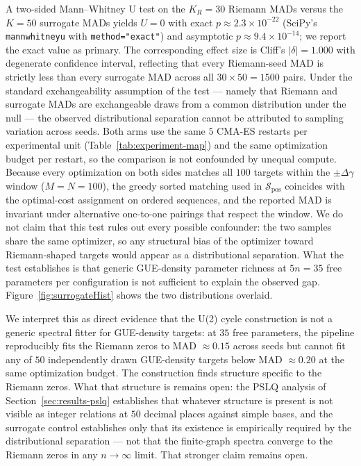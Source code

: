 \documentclass[cntp]{ipart}
\theoremstyle{plain}
\theoremstyle{remark}
\begin{document}
A two-sided Mann--Whitney U test on the $K_R = 30$ Riemann MADs versus the $K = 50$ surrogate MADs yields $U = 0$ with exact $p \approx 2.3 \times 10^{-22}$ (SciPy's \texttt{mannwhitneyu} with \texttt{method="exact"}) and asymptotic $p \approx 9.4 \times 10^{-14}$; we report the exact value as primary. The corresponding effect size is Cliff's $|\delta| = 1.000$ with degenerate confidence interval, reflecting that every Riemann-seed MAD is strictly less than every surrogate MAD across all $30 \times 50 = 1500$ pairs. Under the standard exchangeability assumption of the test --- namely that Riemann and surrogate MADs are exchangeable draws from a common distribution under the null --- the observed distributional separation cannot be attributed to sampling variation across seeds. Both arms use the same $5$ CMA-ES restarts per experimental unit (Table~\ref{tab:experiment-map}) and the same optimization budget per restart, so the comparison is not confounded by unequal compute. Because every optimization on both sides matches all $100$ targets within the $\pm \Delta\gamma$ window ($M = N = 100$), the greedy sorted matching used in $\mathcal{S}_{\mathrm{pos}}$ coincides with the optimal-cost assignment on ordered sequences, and the reported MAD is invariant under alternative one-to-one pairings that respect the window. We do not claim that this test rules out every possible confounder: the two samples share the same optimizer, so any structural bias of the optimizer toward Riemann-shaped targets would appear as a distributional separation. What the test establishes is that generic GUE-density parameter richness at $5n = 35$ free parameters per configuration is not sufficient to explain the observed gap. Figure~\ref{fig:surrogateHist} shows the two distributions overlaid.

We interpret this as direct evidence that the U(2) cycle construction is not a generic spectral fitter for GUE-density targets: at $35$ free parameters, the pipeline reproducibly fits the Riemann zeros to MAD $\approx 0.15$ across seeds but cannot fit any of $50$ independently drawn GUE-density targets below MAD $\approx 0.20$ at the same optimization budget. The construction finds structure specific to the Riemann zeros. What that structure is remains open: the PSLQ analysis of Section~\ref{sec:results-pslq} establishes that whatever structure is present is not visible as integer relations at $50$ decimal places against simple bases, and the surrogate control establishes only that its existence is empirically required by the distributional separation --- not that the finite-graph spectra converge to the Riemann zeros in any $n \to \infty$ limit. That stronger claim remains open.
\end{document}
